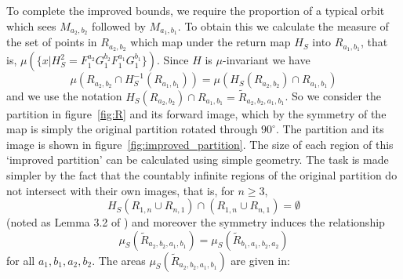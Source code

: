 \documentclass{iopart}
\begin{document}
To complete the improved bounds, we require the proportion of a typical orbit which sees $M_{a_2,b_2}$ followed by $M_{a_1,b_1}$. To obtain this we calculate the measure of the set of points in $R_{a_2,b_2}$ which map under the return map $H_S$ into $R_{a_1,b_1}$, that is, $\mu ( \{ x | H_S^2 = F_1^{a_2}G_1^{b_2}F_1^{a_1}G_1^{b_1} \} )$. Since $H$ is $\mu$-invariant we have
$$
\mu (R_{a_2,b_2} \cap H_S^{-1} (R_{a_1,b_1})) = \mu (H_S(R_{a_2,b_2}) \cap  R_{a_1,b_1}) 
$$
and we use the notation $H_S(R_{a_2,b_2}) \cap  R_{a_1,b_1} = \tilde{R}_{a_2,b_2,a_1,b_1} $. So we consider the partition in figure~\ref{fig:R} and its forward image, which by the symmetry of the map is simply the original partition rotated through $90^{\circ}$. The partition and its image 
is shown in figure~\ref{fig:improved_partition}. The size of each region of this `improved partition' can be calculated using simple geometry. The 
task is made simpler by the fact that the countably infinite regions of the original partition do not intersect with their own images, that is, for $n\ge 3$,
$$
H_S(R_{1,n} \cup R_{n,1} ) \cap (R_{1,n} \cup R_{n,1}) = \emptyset
$$
(noted as Lemma 3.2 of \cite{springham2014polynomial}) and moreover the symmetry induces the relationship
$$
\mu_S (\tilde{R}_{a_2,b_2,a_1,b_1}) = \mu_S (\tilde{R}_{b_1,a_1,b_2,a_2})
$$
for all $a_1, b_1, a_2, b_2$. The areas $\mu_S(\tilde{R}_{a_2,b_2,a_1,b_1})$ are given in:
\end{document}

